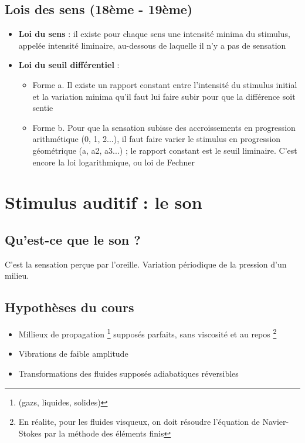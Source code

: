 \subsection{Lois des sens (18ème - 19ème)}
\begin{itemize}
    \item \textbf{Loi du sens} : il existe pour chaque sens une intensité minima du stimulus, appelée intensité liminaire, au-dessous de laquelle il n'y a pas de sensation
    \item \textbf{Loi du seuil différentiel} : 
        \begin{itemize}
            \item Forme a. \newline
            Il existe un rapport constant entre l'intensité du stimulus initial et la variation minima qu'il faut lui faire subir pour que la différence soit sentie
            \item Forme b. \newline
            Pour que la sensation subisse des accroissements en progression arithmétique (0, 1, 2...), il faut faire varier le stimulus en progression géométrique (a, a2, a3...) ; le rapport constant est le seuil liminaire. C'est encore la loi logarithmique, ou loi de Fechner
        \end{itemize}
\end{itemize}
\newpage
\section{Stimulus auditif : le son}
\subsection{Qu'est-ce que le son ?}
C'est la sensation perçue par l'oreille. Variation périodique de la pression d'un milieu.
\subsection{Hypothèses du cours}
\begin{itemize}
    \item Millieux de propagation \footnote{(gazs, liquides, solides)} supposés parfaits, sans viscosité et au repos \footnote{En réalite, pour les fluides visqueux, on doit résoudre l'équation de Navier-Stokes par la méthode des éléments finis}
    \item Vibrations de faible amplitude
    \item Transformations des fluides supposés adiabatiques réversibles
\end{itemize}
